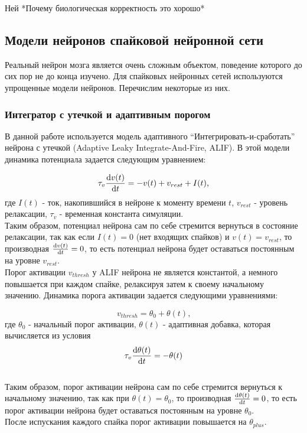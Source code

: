 \documentclass[a4paper]{article}
\begin{document}
Ней
*Почему биологическая корректность это хорошо*

\subsection{Модели нейронов спайковой нейронной сети}
Реальный нейрон мозга является очень сложным объектом, поведение которого до сих пор не до конца изучено. Для спайковых нейронных сетей используются упрощенные модели нейронов. Перечислим некоторые из них.

\subsubsection{Интегратор с утечкой и адаптивным порогом}
В данной работе используется модель адаптивного ``Интегрировать-и-сработать'' нейрона с утечкой (Adaptive Leaky Integrate-And-Fire, ALIF). В этой модели динамика потенциала задается следующим уравнением:

\begin{equation} \label{ALIF_voltage_dynamics}
 \tau_v \dv{v(t)}{t} = -v(t) + v_{rest} + I(t) \text{,}
\end{equation} где $I(t)$ - ток, накопившийся в нейроне к моменту времени $t$, $v_{rest}$ - уровень релаксации, $\tau_v$ - временная константа симуляции.\\
Таким образом, потенциал нейрона сам по себе стремится вернуться в состояние релаксации, так как если $I(t) = 0$ (нет входящих спайков) и $v(t) = v_{rest}$, то производная $\dv{v(t)}{t} = 0$, то есть потенциал нейрона будет оставаться постоянным на уровне $v_{rest}$.\\
Порог активации $v_{thresh}$ у ALIF нейрона не является константой, а немного повышается при каждом спайке, релаксируя затем к своему начальному значению. Динамика порога активации задается следующими уравнениями:

\begin{equation} \label{ALIF_thresh}
 v_{thresh} = \theta_0 + \theta(t) \text{,}
\end{equation} где $\theta_0$ - начальный порог активации, $\theta(t)$ - адаптивная добавка, которая вычисляется из условия\\

\begin{equation} \label{ALIF_thresh_dynamics}
 \tau_v \dv{\theta(t)}{t} = -\theta(t)
\end{equation}\\
Таким образом, порог активации нейрона сам по себе стремится вернуться к начальному значению, так как при $\theta(t) = \theta_0$, то производная $\dv{\theta(t)}{t} = 0$, то есть порог активации нейрона будет оставаться постоянным на уровне $\theta_0$.\\
После испускания каждого спайка порог активации повышается на $\theta_{plus}$.
\end{document}
